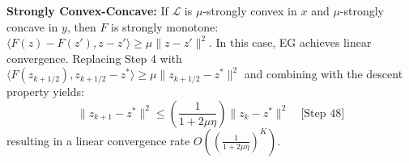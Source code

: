 \documentclass{article}
\begin{document}
\textbf{Strongly Convex-Concave:} If $\mathcal{L}$ is $\mu$-strongly convex in $x$ and $\mu$-strongly concave in $y$, then $F$ is strongly monotone: $\langle F(z) - F(z'), z - z' \rangle \geq \mu \|z - z'\|^2$. In this case, EG achieves linear convergence. Replacing Step 4 with $\langle F(z_{k+1/2}), z_{k+1/2} - z^* \rangle \geq \mu \|z_{k+1/2} - z^*\|^2$ and combining with the descent property yields:
$$ \|z_{k+1} - z^*\|^2 \leq \left( \frac{1}{1 + 2\mu\eta} \right) \|z_k - z^*\|^2 \quad \text{[Step 48]} $$
resulting in a linear convergence rate $O\left( \left(\frac{1}{1+2\mu\eta}\right)^K \right)$.
\end{document}
